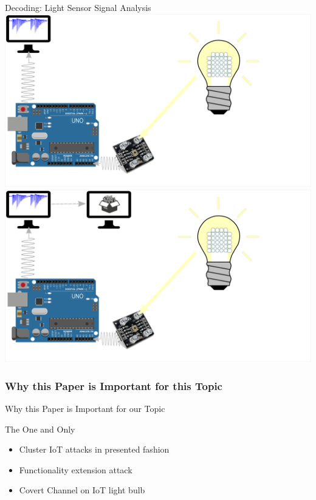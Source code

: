 \documentclass[11pt,t,usepdftitle=false,aspectratio=169]{beamer}
\begin{document}
\begin{frame}{Decoding: Light Sensor Signal Analysis}
{    }
     {
        \centering
        \includegraphics{img/Decoding_4.png}
    }
     {
        \centering
        \includegraphics{img/Decoding_5.png}
    }
\end{frame}

\subsubsection{Why this Paper is Important for this Topic}%
\label{sub:why_this_paper_is_important_for_this_topic}
\begin{frame}{Why this Paper is Important for our Topic}
    \begin{block}{The One and Only}
        \begin{itemize}
            \item Cluster IoT attacks in presented fashion
            \item Functionality extension attack
            \item Covert Channel on IoT light bulb
        \end{itemize}
    \end{block}
\end{frame}
\end{document}
